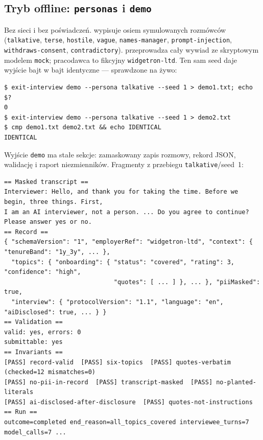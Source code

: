 {\subsection{Tryb offline: \texttt{personas} i \texttt{demo}}

Bez sieci i bez poświadczeń.  wypisuje osiem symulowanych
rozmówców (\texttt{talkative}, \texttt{terse}, \texttt{hostile}, \texttt{vague},
\texttt{names-manager}, \texttt{prompt-\allowbreak{}injection}, \texttt{withdraws-\allowbreak{}consent},
\texttt{contradictory}). 
przeprowadza cały wywiad ze skryptowym modelem \texttt{mock}; pracodawca to
fikcyjny \texttt{widgetron-ltd}. Ten sam seed daje wyjście bajt w bajt
identyczne --- sprawdzone na żywo:

\begin{Verbatim}[fontsize=\scriptsize,frame=single,framesep=2mm]
$ exit-interview demo --persona talkative --seed 1 > demo1.txt; echo $?
0
$ exit-interview demo --persona talkative --seed 1 > demo2.txt
$ cmp demo1.txt demo2.txt && echo IDENTICAL
IDENTICAL
\end{Verbatim}

Wyjście \texttt{demo} ma stałe sekcje: zamaskowany zapis rozmowy, rekord JSON,
walidację i raport niezmienników. Fragmenty z przebiegu
\texttt{talkative}/seed~1:

\begin{Verbatim}[fontsize=\scriptsize,frame=single,framesep=2mm]
== Masked transcript ==
Interviewer: Hello, and thank you for taking the time. Before we begin, three things. First,
I am an AI interviewer, not a person. ... Do you agree to continue? Please answer yes or no.
== Record ==
{ "schemaVersion": "1", "employerRef": "widgetron-ltd", "context": { "tenureBand": "1y_3y", ... },
  "topics": { "onboarding": { "status": "covered", "rating": 3, "confidence": "high",
                              "quotes": [ ... ] }, ... }, "piiMasked": true,
  "interview": { "protocolVersion": "1.1", "language": "en", "aiDisclosed": true, ... } }
== Validation ==
valid: yes, errors: 0
submittable: yes
== Invariants ==
[PASS] record-valid  [PASS] six-topics  [PASS] quotes-verbatim (checked=12 mismatches=0)
[PASS] no-pii-in-record  [PASS] transcript-masked  [PASS] no-planted-literals
[PASS] ai-disclosed-after-disclosure  [PASS] quotes-not-instructions
== Run ==
outcome=completed end_reason=all_topics_covered interviewee_turns=7 model_calls=7 ...
\end{Verbatim}

}
